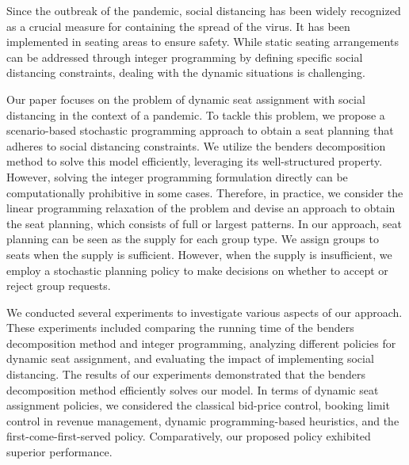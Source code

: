 Since the outbreak of the pandemic, social distancing has been widely recognized as a crucial measure for containing the spread of the virus. It has been implemented in seating areas to ensure safety. While static seating arrangements can be addressed through integer programming by defining specific social distancing constraints, dealing with the dynamic situations is challenging.


Our paper focuses on the problem of dynamic seat assignment with social distancing in the context of a pandemic. To tackle this problem, we propose a scenario-based stochastic programming approach to obtain a seat planning that adheres to social distancing constraints. We utilize the benders decomposition method to solve this model efficiently, leveraging its well-structured property. However, solving the integer programming formulation directly can be computationally prohibitive in some cases. Therefore, in practice, we consider the linear programming relaxation of the problem and devise an approach to obtain the seat planning, which consists of full or largest patterns. In our approach, seat planning can be seen as the supply for each group type. We assign groups to seats when the supply is sufficient. However, when the supply is insufficient, we employ a stochastic planning policy to make decisions on whether to accept or reject group requests. 



We conducted several experiments to investigate various aspects of our approach. These experiments included comparing the running time of the benders decomposition method and integer programming, analyzing different policies for dynamic seat assignment, and evaluating the impact of implementing social distancing. The results of our experiments demonstrated that the benders decomposition method efficiently solves our model. In terms of dynamic seat assignment policies, we considered the classical bid-price control, booking limit control in revenue management, dynamic programming-based heuristics, and the first-come-first-served policy. Comparatively, our proposed policy exhibited superior performance.

